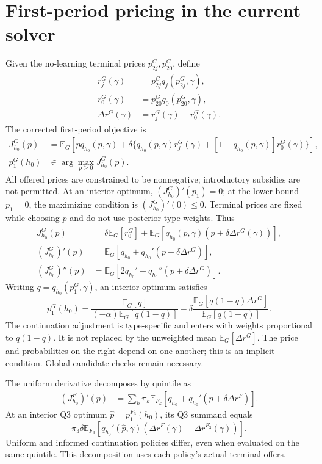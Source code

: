 \documentclass[11pt]{article}
\newcommand{\E}{\mathbb{E}}
\begin{document}
\section{First-period pricing in the current solver}
Given the no-learning terminal prices $p_{2j}^G,p_{20}^G$, define
\begin{align}
 r_j^G(\gamma)&=p_{2j}^Gq_j(p_{2j}^G,\gamma),\\
 r_0^G(\gamma)&=p_{20}^Gq_0(p_{20}^G,\gamma),\\
 \Delta r^G(\gamma)&=r_j^G(\gamma)-r_0^G(\gamma).
\end{align}
The corrected first-period objective is
\begin{align}
 J_{h_0}^G(p)&=\E_G\!\left[pq_{h_0}(p,\gamma)+\delta\{
 q_{h_0}(p,\gamma)r_j^G(\gamma)
 +[1-q_{h_0}(p,\gamma)]r_0^G(\gamma)\}\right],\\
 p_1^G(h_0)&\in\arg\max_{p\geq0} J_{h_0}^G(p).
\end{align}
All offered prices are constrained to be nonnegative; introductory subsidies
are not permitted. At an interior optimum, $(J_{h_0}^G)'(p_1)=0$; at the
lower bound $p_1=0$, the maximizing condition is $(J_{h_0}^G)'(0)\leq0$.
Terminal prices
are fixed while choosing $p$ and do not use posterior type weights. Thus
\begin{align}
 J_{h_0}^G(p)&=\delta\E_G[r_0^G]
 +\E_G[q_{h_0}(p,\gamma)(p+\delta\Delta r^G(\gamma))],\\
 (J_{h_0}^G)'(p)&=\E_G[q_{h_0}+q_{h_0}'(p+\delta\Delta r^G)],\\
 (J_{h_0}^G)''(p)&=\E_G[2q_{h_0}'+q_{h_0}''(p+\delta\Delta r^G)].
\end{align}
Writing $q=q_{h_0}(p_1^G,\gamma)$, an interior optimum satisfies
\begin{equation}
 \boxed{p_1^G(h_0)=\frac{\E_G[q]}{(-\alpha)\E_G[q(1-q)]}
 -\delta\frac{\E_G[q(1-q)\Delta r^G]}{\E_G[q(1-q)]}.}
\end{equation}
The continuation adjustment is type-specific and enters with weights
proportional to $q(1-q)$. It is not replaced by the unweighted mean
$\E_G[\Delta r^G]$. The price and probabilities on the right depend on one
another; this is an implicit condition. Global candidate checks remain necessary.

The uniform derivative decomposes by quintile as
\begin{align}
 (J_{h_0}^F)'(p)
 &=\sum_k\pi_k\E_{F_k}[q_{h_0}+q_{h_0}'(p+\delta\Delta r^F)].
\end{align}
At an interior Q3 optimum $\widehat p=p_1^{F_3}(h_0)$, its Q3 summand equals
\begin{equation}
 \pi_3\delta\E_{F_3}[q_{h_0}'(\widehat p,\gamma)
 (\Delta r^F(\gamma)-\Delta r^{F_3}(\gamma))].
\end{equation}
Uniform and informed continuation policies differ, even when evaluated on
the same quintile. This decomposition uses each policy's actual terminal offers.
\end{document}
